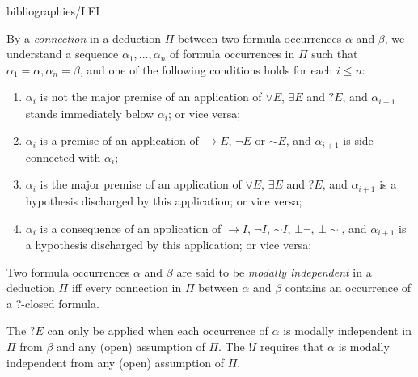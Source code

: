 \begin{entry}{bibliographies/LEI}
\begin{clarifications}
By a \emph{connection} in a deduction $\Pi$ between two formula occurrences $\alpha$ 
and
$\beta$, we understand a sequence $\alpha_{1},\ldots,\alpha_{n}$ of formula 
occurrences
in $\Pi$ such that $\alpha_{1}=\alpha, \alpha_{n}=\beta$, and one of the 
following
conditions holds for each $i \leq n$:


\begin{enumerate}

\item
 $\alpha_{i}$ is not the major premise of an application of $\vee E$, 
$\exists E$ and
$?E$, and $\alpha_{i+1}$ stands immediately below $\alpha_{i}$; or vice 
versa;

\item 
$\alpha_{i}$ is a premise of an application of $\rightarrow E$, $\neg E$ or $\sim E$, and $\alpha_{i+1}$ is side connected with  $\alpha_{i}$;

\item 
$\alpha_{i}$ is  the major premise of an application of $\vee E$, $\exists E$ and
$?E$, and $\alpha_{i+1}$ is a hypothesis discharged by this application;  or 
vice versa;

\item 
$\alpha_{i}$ is a consequence of an application of $\rightarrow I$, 
$\neg I$, $\sim I$,
$\bot\neg$, $\bot\!\!\sim$, and $\alpha_{i+1}$ is a hypothesis discharged by 
this application;
 or vice versa;
\end{enumerate}

Two formula occurrences $\alpha$
and $\beta$  are said to be \emph{modally independent} in a deduction $\Pi$ iff every
connection in $\Pi$ between $\alpha$ and $\beta$ contains an occurrence of a 
?-closed formula.

The $?E$ can only be applied when each occurrence of $\alpha$ is modally independent in $\Pi$ from $\beta$ and any (open) assumption of $\Pi$. The $!I$ requires that $\alpha$ is modally independent from any (open) assumption of $\Pi$.

\end{clarifications}




\end{entry}
